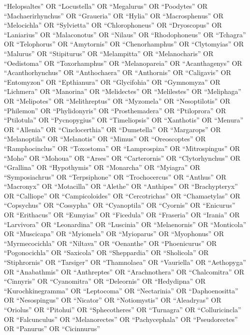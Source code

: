 \documentclass[
  number,
  review,
  onecolumn]{elsarticle}
\begin{document}
``Helopsaltes'' OR ``Locustella'' OR ``Megalurus'' OR ``Poodytes'' OR
``Machaerirhynchus'' OR ``Graueria'' OR ``Hylia'' OR ``Macrosphenus'' OR
``Melocichla'' OR ``Sylvietta'' OR ``Chlorophoneus'' OR ``Dryoscopus''
OR ``Laniarius'' OR ``Malaconotus'' OR ``Nilaus'' OR ``Rhodophoneus'' OR
``Tchagra'' OR ``Telophorus'' OR ``Amytornis'' OR ``Chenorhamphus'' OR
``Clytomyias'' OR ``Malurus'' OR ``Stipiturus'' OR ``Melampitta'' OR
``Melanocharis'' OR ``Oedistoma'' OR ``Toxorhamphus'' OR
``Melanopareia'' OR ``Acanthagenys'' OR ``Acanthorhynchus'' OR
``Anthochaera'' OR ``Anthornis'' OR ``Caligavis'' OR ``Entomyzon'' OR
``Epthianura'' OR ``Glycifohia'' OR ``Gymnomyza'' OR ``Lichmera'' OR
``Manorina'' OR ``Melidectes'' OR ``Melilestes'' OR ``Meliphaga'' OR
``Melipotes'' OR ``Melithreptus'' OR ``Myzomela'' OR ``Nesoptilotis'' OR
``Philemon'' OR ``Phylidonyris'' OR ``Prosthemadera'' OR ``Ptiloprora''
OR ``Ptilotula'' OR ``Pycnopygius'' OR ``Timeliopsis'' OR ``Xanthotis''
OR ``Menura'' OR ``Allenia'' OR ``Cinclocerthia'' OR ``Dumetella'' OR
``Margarops'' OR ``Melanoptila'' OR ``Melanotis'' OR ``Mimus'' OR
``Oreoscoptes'' OR ``Ramphocinclus'' OR ``Toxostoma'' OR ``Lamprospiza''
OR ``Mitrospingus'' OR ``Moho'' OR ``Mohoua'' OR ``Arses'' OR
``Carterornis'' OR ``Clytorhynchus'' OR ``Grallina'' OR ``Hypothymis''
OR ``Monarcha'' OR ``Myiagra'' OR ``Symposiachrus'' OR ``Terpsiphone''
OR ``Trochocercus'' OR ``Anthus'' OR ``Macronyx'' OR ``Motacilla'' OR
``Alethe'' OR ``Anthipes'' OR ``Brachypteryx'' OR ``Calliope'' OR
``Campicoloides'' OR ``Cercotrichas'' OR ``Chamaetylas'' OR
``Copsychus'' OR ``Cossypha'' OR ``Cyanoptila'' OR ``Cyornis'' OR
``Enicurus'' OR ``Erithacus'' OR ``Eumyias'' OR ``Ficedula'' OR
``Fraseria'' OR ``Irania'' OR ``Larvivora'' OR ``Leonardina'' OR
``Luscinia'' OR ``Melaenornis'' OR ``Monticola'' OR ``Muscicapa'' OR
``Myiomela'' OR ``Myioparus'' OR ``Myophonus'' OR ``Myrmecocichla'' OR
``Niltava'' OR ``Oenanthe'' OR ``Phoenicurus'' OR ``Pogonocichla'' OR
``Saxicola'' OR ``Sheppardia'' OR ``Sholicola'' OR ``Stiphrornis'' OR
``Tarsiger'' OR ``Thamnolaea'' OR ``Vauriella'' OR ``Aethopyga'' OR
``Anabathmis'' OR ``Anthreptes'' OR ``Arachnothera'' OR ``Chalcomitra''
OR ``Cinnyris'' OR ``Cyanomitra'' OR ``Deleornis'' OR ``Hedydipna'' OR
``Kurochkinegramma'' OR ``Leptocoma'' OR ``Nectarinia'' OR
``Daphoenositta'' OR ``Nesospingus'' OR ``Nicator'' OR ``Notiomystis''
OR ``Aleadryas'' OR ``Oriolus'' OR ``Pitohui'' OR ``Sphecotheres'' OR
``Turnagra'' OR ``Colluricincla'' OR ``Falcunculus'' OR ``Melanorectes''
OR ``Pachycephala'' OR ``Pseudorectes'' OR ``Panurus'' OR ``Cicinnurus''
\end{document}
